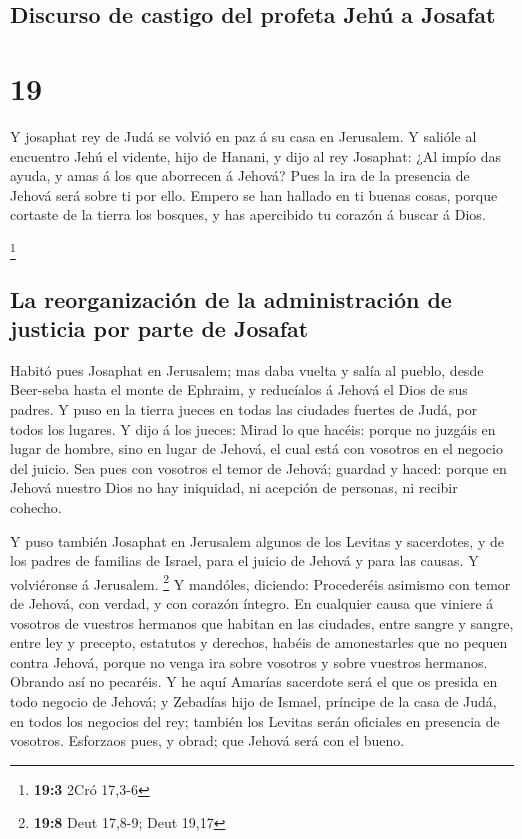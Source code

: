 \hypertarget{discurso-de-castigo-del-profeta-jehuxfa-a-josafat}{%
\subsection{Discurso de castigo del profeta Jehú a
Josafat}\label{discurso-de-castigo-del-profeta-jehuxfa-a-josafat}}

\hypertarget{section-18}{%
\section{19}\label{section-18}}

 Y josaphat rey de Judá se volvió en paz á su casa en
Jerusalem.  Y salióle al encuentro Jehú el vidente, hijo de
Hanani, y dijo al rey Josaphat: ¿Al impío das ayuda, y amas á los que
aborrecen á Jehová? Pues la ira de la presencia de Jehová será sobre ti
por ello.  Empero se han hallado en ti buenas cosas, porque
cortaste de la tierra los bosques, y has apercibido tu corazón á buscar
á Dios.

\footnote{\textbf{19:3} 2Cró 17,3-6}

\hypertarget{la-reorganizaciuxf3n-de-la-administraciuxf3n-de-justicia-por-parte-de-josafat}{%
\subsection{La reorganización de la administración de justicia por parte
de
Josafat}\label{la-reorganizaciuxf3n-de-la-administraciuxf3n-de-justicia-por-parte-de-josafat}}

 Habitó pues Josaphat en Jerusalem; mas daba vuelta y salía
al pueblo, desde Beer-seba hasta el monte de Ephraim, y reducíalos á
Jehová el Dios de sus padres.  Y puso en la tierra jueces en
todas las ciudades fuertes de Judá, por todos los lugares. 
Y dijo á los jueces: Mirad lo que hacéis: porque no juzgáis en lugar de
hombre, sino en lugar de Jehová, el cual está con vosotros en el negocio
del juicio.  Sea pues con vosotros el temor de Jehová;
guardad y haced: porque en Jehová nuestro Dios no hay iniquidad, ni
acepción de personas, ni recibir cohecho.

 Y puso también Josaphat en Jerusalem algunos de los Levitas
y sacerdotes, y de los padres de familias de Israel, para el juicio de
Jehová y para las causas. Y volviéronse á Jerusalem. \footnote{\textbf{19:8}
  Deut 17,8-9; Deut 19,17}  Y mandóles, diciendo:
Procederéis asimismo con temor de Jehová, con verdad, y con corazón
íntegro.  En cualquier causa que viniere á vosotros de
vuestros hermanos que habitan en las ciudades, entre sangre y sangre,
entre ley y precepto, estatutos y derechos, habéis de amonestarles que
no pequen contra Jehová, porque no venga ira sobre vosotros y sobre
vuestros hermanos. Obrando así no pecaréis.  Y he aquí
Amarías sacerdote será el que os presida en todo negocio de Jehová; y
Zebadías hijo de Ismael, príncipe de la casa de Judá, en todos los
negocios del rey; también los Levitas serán oficiales en presencia de
vosotros. Esforzaos pues, y obrad; que Jehová será con el bueno.

